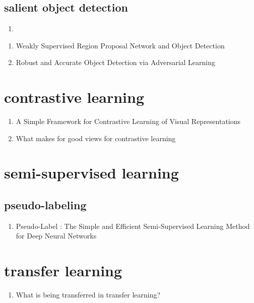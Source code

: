 \documentclass[acmlarge]{acmart}
\begin{document}
	\subsection{salient object detection}
	\begin{enumerate}
		\item
	\end{enumerate}
\begin{enumerate}
	\item Weakly Supervised Region Proposal Network and Object Detection \cite{Tang2018WeaklySR} 

	\item Robust and Accurate Object Detection via Adversarial Learning \cite{Chen2021RobustAA} 

\end{enumerate}
\section{contrastive learning}
\begin{enumerate}
	\item A Simple Framework for Contrastive Learning of Visual Representations \cite{Chen2020ASF} 

	\item What makes for good views for contrastive learning \cite{Tian2020WhatMF} 

\end{enumerate}
\section{semi-supervised learning}
	\subsection{pseudo-labeling}
	\begin{enumerate}
		\item Pseudo-Label : The Simple and Efficient Semi-Supervised Learning Method for Deep Neural Networks \cite{Lee2013PseudoLabelT} 

	\end{enumerate}
\begin{enumerate}
\end{enumerate}
\section{transfer learning}
\begin{enumerate}
	\item What is being transferred in transfer learning? \cite{Neyshabur2020WhatIB} 

\end{enumerate}
\end{document}
